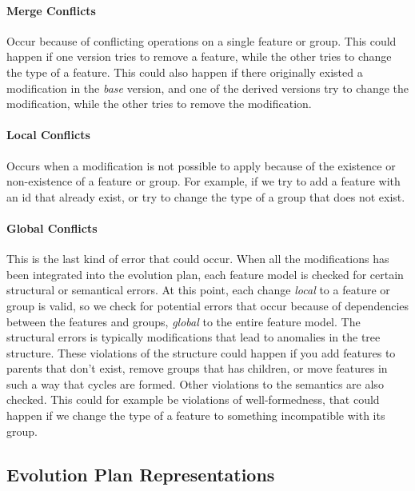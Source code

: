 \documentclass[a4paper,english]{ifimaster}
\begin{document}
\paragraph{Merge Conflicts}%
\label{par:merge_conflicts}

Occur because of conflicting operations on a single feature or group. This could happen if one version tries to remove a feature, while the other tries to change the type of a feature. This could also happen if there originally existed a modification in the \textit{base} version, and one of the derived versions try to change the modification, while the other tries to remove the modification.

\paragraph{Local Conflicts}%
\label{par:local_conflicts}

Occurs when a modification is not possible to apply because of the existence or non-existence of a feature or group. For example, if we try to add a feature with an id that already exist, or try to change the type of a group that does not exist.

\paragraph{Global Conflicts}%
\label{par:global_conflicts}

This is the last kind of error that could occur. When all the modifications has been integrated into the evolution plan, each feature model is checked for certain structural or semantical errors. At this point, each change \textit{local} to a feature or group is valid, so we check for potential errors that occur because of dependencies between the features and groups, \textit{global} to the entire feature model. The structural errors is typically modifications that lead to anomalies in the tree structure. These violations of the structure could happen if you add features to parents that don't exist, remove groups that has children, or move features in such a way that cycles are formed. Other violations to the semantics are also checked. This could for example be violations of well-formedness, that could happen if we change the type of a feature to something incompatible with its group.

\subsection{Evolution Plan Representations}%
\label{sub:evolution_plan_representations}
\end{document}
